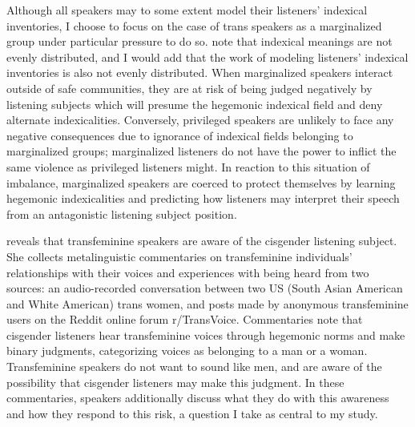\documentclass[12pt,twoside]{reedthesis}
\begin{document}
Although all speakers may to some extent model their listeners' indexical inventories, I choose to focus on the case of trans speakers as a marginalized group under particular pressure to do so. \textcite{barrett_sexuality_2024} note that indexical meanings are not evenly distributed, and I would add that the work of modeling listeners' indexical inventories is also not evenly distributed. When marginalized speakers interact outside of safe communities, they are at risk of being judged negatively by listening subjects which will presume the hegemonic indexical field and deny alternate indexicalities. Conversely, privileged speakers are unlikely to face any negative consequences due to ignorance of indexical fields belonging to marginalized groups; marginalized listeners do not have the power to inflict the same violence as privileged listeners might. In reaction to this situation of imbalance, marginalized speakers are coerced to protect themselves by learning hegemonic indexicalities and predicting how listeners may interpret their speech from an antagonistic listening subject position.
	
\textcite{heffernan_constructing_2023} reveals that transfeminine speakers are aware of the cisgender listening subject. She collects metalinguistic commentaries on transfeminine individuals' relationships with their voices and experiences with being heard from two sources: an audio-recorded conversation between two US (South Asian American and White American) trans women, and posts made by anonymous transfeminine users on the Reddit online forum r/TransVoice. Commentaries note that cisgender listeners hear transfeminine voices through hegemonic norms and make binary judgments, categorizing voices as belonging to a man or a woman. Transfeminine speakers do not want to sound like men, and are aware of the possibility that cisgender listeners may make this judgment. In these commentaries, speakers additionally discuss what they do with this awareness and how they respond to this risk, a question I take as central to my study.
\end{document}
